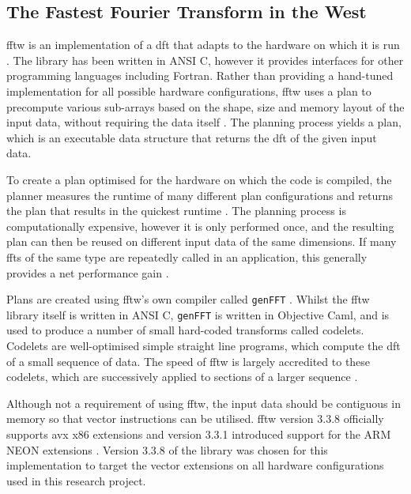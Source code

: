 \documentclass[a4paper,11pt]{report}
\begin{document}
\subsection{The Fastest Fourier Transform in the West}
\gls{fftw} is an implementation of a \gls{dft} that adapts to the hardware on which it is run \cite{frigo2005design}. The library has been written in ANSI C, however it provides interfaces for other programming languages including Fortran. Rather than providing a hand-tuned implementation for all possible hardware configurations, \gls{fftw} uses a plan to precompute various sub-arrays based on the shape, size and memory layout of the input data, without requiring the data itself \cite{frigo2005design}. The planning process yields a plan, which is an executable data structure that returns the \gls{dft} of the given input data. 
\par
To create a plan optimised for the hardware on which the code is compiled, the planner measures the runtime of many different plan configurations and returns the plan that results in the quickest runtime \cite{frigo2005design}. The planning process is computationally expensive, however it is only performed once, and the resulting plan can then be reused on different input data of the same dimensions. If many \gls{fft}s of the same type are repeatedly called in an application, this generally provides a net performance gain \cite{frigo2003fftw}.
\par
Plans are created using \gls{fftw}'s own compiler called \texttt{genFFT}  \cite{frigo2005design}. Whilst the \gls{fftw} library itself is written in ANSI C, \texttt{genFFT} is written in Objective Caml, and is used to produce a number of small hard-coded transforms called codelets. Codelets are well-optimised simple straight line programs, which compute the \gls{dft} of a small sequence of data. The speed of \gls{fftw} is largely accredited to these codelets, which are successively applied to sections of a larger sequence \cite{frigo2005design}. 
\par
Although not a requirement of using \gls{fftw}, the input data should be contiguous in memory so that vector instructions can be utilised. \gls{fftw} version 3.3.8 officially supports \gls{avx} x86 extensions and version 3.3.1 introduced support for the ARM NEON extensions \cite{frigo2003fftw}. Version 3.3.8 of the library was chosen for this implementation to target the vector extensions on all hardware configurations used in this research project. 
\end{document}
